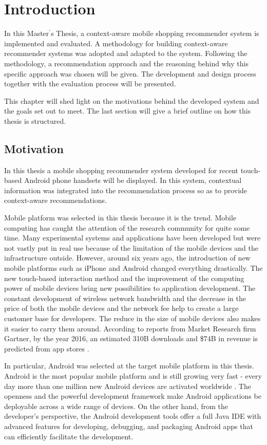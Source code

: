\chapter{Introduction}\label{chapter:introduction}

In this Master$^\prime$s Thesis, a context-aware mobile shopping recommender system is implemented and evaluated. A methodology for building context-aware recommender systems was adopted and adapted to the system. Following the methodology, a recommendation approach and the reasoning behind why this specific approach was chosen will be given. The development and design process together with the evaluation process will be presented.

This chapter will shed light on the motivations behind the developed system and the goals set out to meet. The last section will give a brief outline on how this thesis is structured.

\section{Motivation} \label{sec:mv}

In this thesis a mobile shopping recommender system developed for recent touch-based Android phone handsets will be displayed. In this system, contextual information was integrated into the recommendation process so as to provide context-aware recommendations.

Mobile platform was selected in this thesis because it is the trend. Mobile computing has caught the attention of the research community for quite some time. Many experimental systems and applications have been developed but were not vastly put in real use because of the limitation of the mobile devices and the infrastructure outside. However, around six years ago, the introduction of new mobile platforms such as iPhone and Android changed everything drastically. The new touch-based interaction method and the improvement of the computing power of mobile devices bring new possibilities to application development. The constant development of wireless network bandwidth and the decrease in the price of both the mobile devices and the network fee help to create a large customer base for developers. The reduce in the size of mobile devices also makes it easier to carry them around. According to reports from Market Research firm Gartner, by the year 2016, an estimated 310B downloads and \$74B in revenue is predicted from app stores \cite{ref:39}. 

In particular, Android was selected at the target mobile platform in this thesis. Android is the most popular mobile platform and is still growing very fast - every day more than one million new Android devices are activated worldwide \cite{ref:42}. The openness and the powerful development framework make Android applications be deployable across a wide range of devices. On the other hand, from the developer's perspective, the Android development tools offer a full Java IDE with advanced features for developing, debugging, and packaging Android apps that can efficiently facilitate the development.


